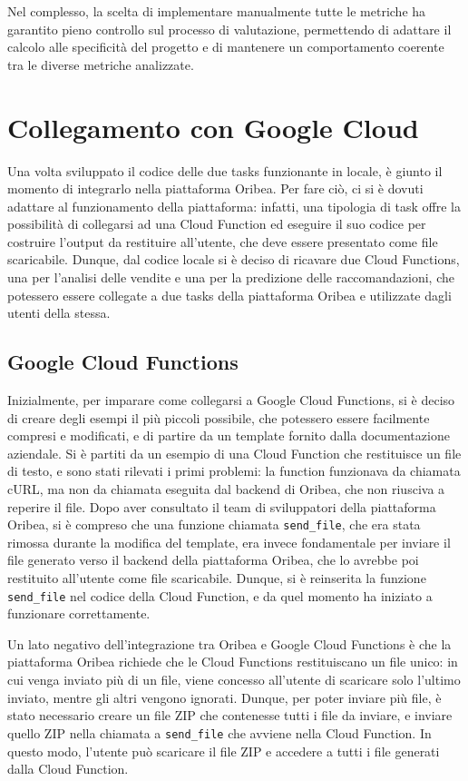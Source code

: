 Nel complesso, la scelta di implementare manualmente tutte le metriche ha garantito pieno controllo sul processo di valutazione, permettendo di adattare il calcolo alle specificità del progetto e di mantenere un comportamento coerente tra le diverse metriche analizzate.


\section{Collegamento con Google Cloud}

Una volta sviluppato il codice delle due tasks funzionante in locale, è giunto il momento di integrarlo nella piattaforma Oribea.
Per fare ciò, ci si è dovuti adattare al funzionamento della piattaforma: infatti, una tipologia di task offre la possibilità di collegarsi ad una Cloud Function ed eseguire il suo codice per costruire l'output da restituire all'utente, che deve essere presentato come file scaricabile. Dunque, dal codice locale si è deciso di ricavare due Cloud Functions, una per l'analisi delle vendite e una per la predizione delle raccomandazioni, che potessero essere collegate a due tasks della piattaforma Oribea e utilizzate dagli utenti della stessa.

\subsection{Google Cloud Functions}

Inizialmente, per imparare come collegarsi a Google Cloud Functions, si è deciso di creare degli esempi il più piccoli possibile, che potessero essere facilmente compresi e modificati, e di partire da un template fornito dalla documentazione aziendale. Si è partiti da un esempio di una Cloud Function che restituisce un file di testo, e sono stati rilevati i primi problemi: la function funzionava da chiamata cURL, ma non da chiamata eseguita dal backend di Oribea, che non riusciva a reperire il file. Dopo aver consultato il team di sviluppatori della piattaforma Oribea, si è compreso che una funzione chiamata \texttt{send\_file}, che era stata rimossa durante la modifica del template, era invece fondamentale per inviare il file generato verso il backend della piattaforma Oribea, che lo avrebbe poi restituito all'utente come file scaricabile. Dunque, si è reinserita la funzione \texttt{send\_file} nel codice della Cloud Function, e da quel momento ha iniziato a funzionare correttamente.

Un lato negativo dell'integrazione tra Oribea e Google Cloud Functions è che la piattaforma Oribea richiede che le Cloud Functions restituiscano un file unico: in cui venga inviato più di un file, viene concesso all'utente di scaricare solo l'ultimo inviato, mentre gli altri vengono ignorati. Dunque, per poter inviare più file, è stato necessario creare un file ZIP che contenesse tutti i file da inviare, e inviare quello ZIP nella chiamata a \texttt{send\_file} che avviene nella Cloud Function. In questo modo, l'utente può scaricare il file ZIP e accedere a tutti i file generati dalla Cloud Function.

